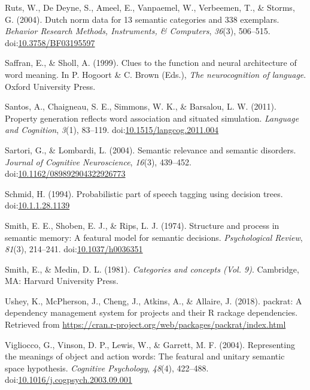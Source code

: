 \documentclass[man]{apa6}
\begin{document}
\leavevmode\hypertarget{ref-Ruts2004}{}%
Ruts, W., De Deyne, S., Ameel, E., Vanpaemel, W., Verbeemen, T., \& Storms, G. (2004). Dutch norm data for 13 semantic categories and 338 exemplars. \emph{Behavior Research Methods, Instruments, \& Computers}, \emph{36}(3), 506--515. doi:\href{https://doi.org/10.3758/BF03195597}{10.3758/BF03195597}

\leavevmode\hypertarget{ref-Saffran1999}{}%
Saffran, E., \& Sholl, A. (1999). Clues to the function and neural architecture of word meaning. In P. Hogoort \& C. Brown (Eds.), \emph{The neurocognition of language}. Oxford University Press.

\leavevmode\hypertarget{ref-Santos2011}{}%
Santos, A., Chaigneau, S. E., Simmons, W. K., \& Barsalou, L. W. (2011). Property generation reflects word association and situated simulation. \emph{Language and Cognition}, \emph{3}(1), 83--119. doi:\href{https://doi.org/10.1515/langcog.2011.004}{10.1515/langcog.2011.004}

\leavevmode\hypertarget{ref-Sartori2004}{}%
Sartori, G., \& Lombardi, L. (2004). Semantic relevance and semantic disorders. \emph{Journal of Cognitive Neuroscience}, \emph{16}(3), 439--452. doi:\href{https://doi.org/10.1162/089892904322926773}{10.1162/089892904322926773}

\leavevmode\hypertarget{ref-Schmid1994}{}%
Schmid, H. (1994). Probabilistic part of speech tagging using decision trees. doi:\href{https://doi.org/10.1.1.28.1139}{10.1.1.28.1139}

\leavevmode\hypertarget{ref-Smith1974}{}%
Smith, E. E., Shoben, E. J., \& Rips, L. J. (1974). Structure and process in semantic memory: A featural model for semantic decisions. \emph{Psychological Review}, \emph{81}(3), 214--241. doi:\href{https://doi.org/10.1037/h0036351}{10.1037/h0036351}

\leavevmode\hypertarget{ref-Smith1981}{}%
Smith, E., \& Medin, D. L. (1981). \emph{Categories and concepts (Vol. 9)}. Cambridge, MA: Harvard University Press.

\leavevmode\hypertarget{ref-Ushey2018}{}%
Ushey, K., McPherson, J., Cheng, J., Atkins, A., \& Allaire, J. (2018). packrat: A dependency management system for projects and their R rackage dependencies. Retrieved from \url{https://cran.r-project.org/web/packages/packrat/index.html}

\leavevmode\hypertarget{ref-Vigliocco2004}{}%
Vigliocco, G., Vinson, D. P., Lewis, W., \& Garrett, M. F. (2004). Representing the meanings of object and action words: The featural and unitary semantic space hypothesis. \emph{Cognitive Psychology}, \emph{48}(4), 422--488. doi:\href{https://doi.org/10.1016/j.cogpsych.2003.09.001}{10.1016/j.cogpsych.2003.09.001}
\end{document}
